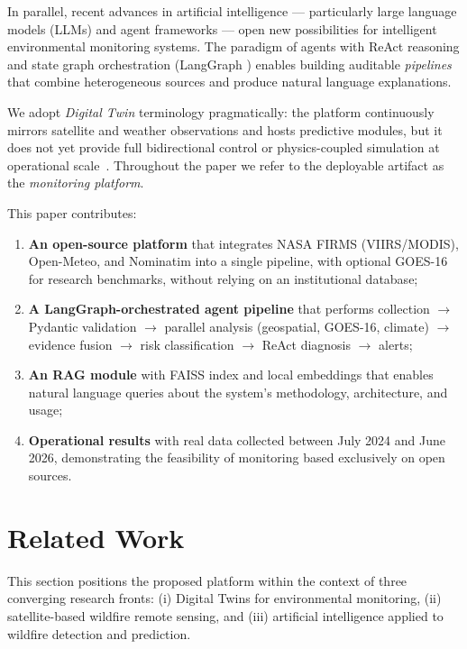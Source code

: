 \documentclass[preprint,12pt,times,numbers]{elsarticle}
\begin{document}
In parallel, recent advances in artificial intelligence --- particularly large language models (LLMs) and agent frameworks --- open new possibilities for intelligent environmental monitoring systems. The paradigm of agents with ReAct reasoning \cite{article:react2023} and state graph orchestration (LangGraph \cite{manual:langgraph2024}) enables building auditable \emph{pipelines} that combine heterogeneous sources and produce natural language explanations.

We adopt \emph{Digital Twin} terminology pragmatically: the platform continuously mirrors satellite and weather observations and hosts predictive modules, but it does not yet provide full bidirectional control or physics-coupled simulation at operational scale~\cite{article:bauer2023natrev}. Throughout the paper we refer to the deployable artifact as the \emph{monitoring platform}.

This paper contributes:

\begin{enumerate}
    \item \textbf{An open-source platform} that integrates NASA FIRMS (VIIRS/MODIS), Open-Meteo, and Nominatim into a single pipeline, with optional GOES-16 for research benchmarks, without relying on an institutional database;
    \item \textbf{A LangGraph-orchestrated agent pipeline} that performs collection $\rightarrow$ Pydantic validation $\rightarrow$ parallel analysis (geospatial, GOES-16, climate) $\rightarrow$ evidence fusion $\rightarrow$ risk classification $\rightarrow$ ReAct diagnosis $\rightarrow$ alerts;
    \item \textbf{An RAG module} with FAISS index and local embeddings that enables natural language queries about the system's methodology, architecture, and usage;
    \item \textbf{Operational results} with real data collected between July 2024 and June 2026, demonstrating the feasibility of monitoring based exclusively on open sources.
\end{enumerate}

\section{Related Work}
\label{sec:related}

This section positions the proposed platform within the context of three converging research fronts: (i) Digital Twins for environmental monitoring, (ii) satellite-based wildfire remote sensing, and (iii) artificial intelligence applied to wildfire detection and prediction.
\end{document}
